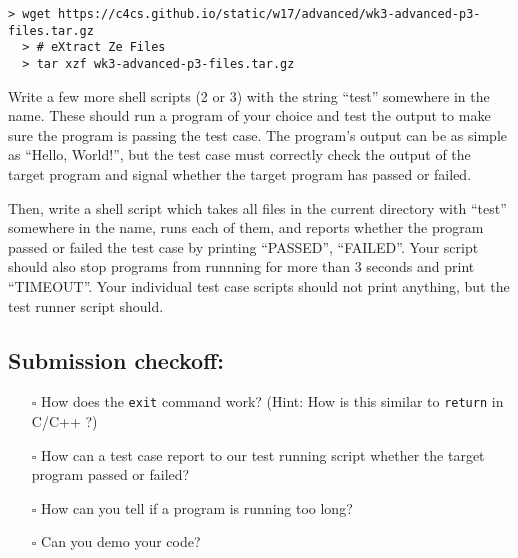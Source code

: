 \documentclass{article}
\begin{document}
\begin{Verbatim}[fontsize=\footnotesize]
  > wget https://c4cs.github.io/static/w17/advanced/wk3-advanced-p3-files.tar.gz
  > # eXtract Ze Files
  > tar xzf wk3-advanced-p3-files.tar.gz
\end{Verbatim}

\noindent
Write a few more shell scripts (2 or 3) with the string ``test'' somewhere in
the name. These should run a program of your choice and test the output to make
sure the program is passing the test case. The program's output can be as
simple as ``Hello, World!'', but the test case must correctly check the output
of the target program and signal whether the target program has passed or
failed.

\noindent
Then, write a shell script which takes all files in the current directory with
``test'' somewhere in the name, runs each of them, and reports whether the
program passed or failed the test case by printing ``PASSED'', ``FAILED''. Your
script should also stop programs from runnning for more than 3 seconds and
print ``TIMEOUT''. Your individual test case scripts should not print anything,
but the test runner script should.


\subsection*{Submission checkoff:}
\begin{itemize}
  \item[$\square$] How does the \texttt{exit} command work? (Hint: How is this similar to
    \texttt{return} in C/C++ ?)
  \item[$\square$] How can a test case report to our test running script whether the target program passed or failed?
  \item[$\square$] How can you tell if a program is running too long?
  \item[$\square$] Can you demo your code?
\end{itemize}
\end{document}
